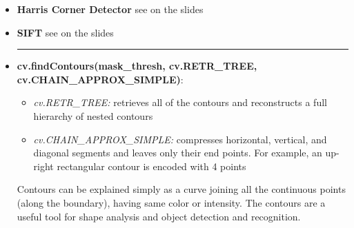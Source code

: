 \documentclass{article}
\begin{document}
\begin{itemize}
    \par\noindent\rule{\textwidth}{0.5pt}
    \par

    \item \textbf{Harris Corner Detector} see on the slides
    \item \textbf{SIFT} see on the slides


    \par\noindent\rule{\textwidth}{0.5pt}
    \par


    
    \item \textbf{cv.findContours(mask\_thresh, cv.RETR\_TREE, \\cv.CHAIN\_APPROX\_SIMPLE)}:
    \begin{itemize}
        \item \textit{cv.RETR\_TREE:} retrieves all of the contours and reconstructs a full hierarchy of nested contours
        \item \textit{cv.CHAIN\_APPROX\_SIMPLE:} compresses horizontal, vertical, and diagonal segments and leaves only their end points. For example, an up-right rectangular contour is encoded with 4 points
    \end{itemize}
    Contours can be explained simply as a curve joining all the continuous points (along the boundary), having same color or intensity. The contours are a useful tool for shape analysis and object detection and recognition.


\end{itemize}
\end{document}
